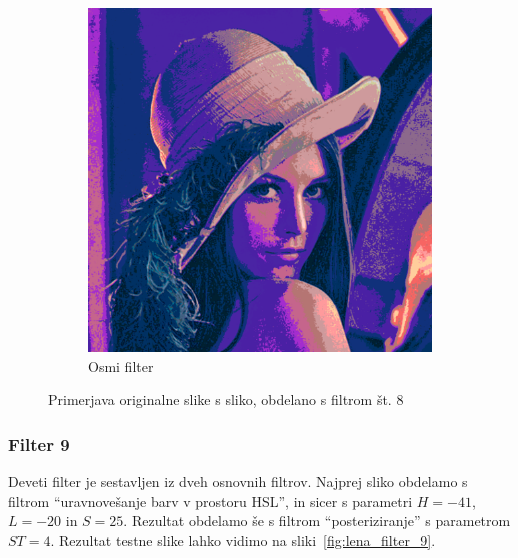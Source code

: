 \documentclass[a4paper, 12pt]{book}
\begin{document}
\begin{figure}[!ht]
\begin{subfigure}[b]{0.4\textwidth}
        \includegraphics[width=\textwidth]{lena_filter_8}
        \caption{Osmi filter}
    \end{subfigure}
    \caption{Primerjava originalne slike s sliko, obdelano s filtrom št. 8}
    \label{fig:lena_filter_8}
\end{figure}


\subsubsection*{Filter 9}
Deveti filter je sestavljen iz dveh osnovnih filtrov. Najprej sliko obdelamo s
filtrom ``uravnovešanje barv v prostoru HSL'', in sicer s parametri $H = -41$,
$L = -20$ in $S = 25$. Rezultat obdelamo še s filtrom ``posteriziranje'' s
parametrom $ST = 4$. Rezultat testne slike lahko vidimo na
sliki~\ref{fig:lena_filter_9}.
\end{document}
